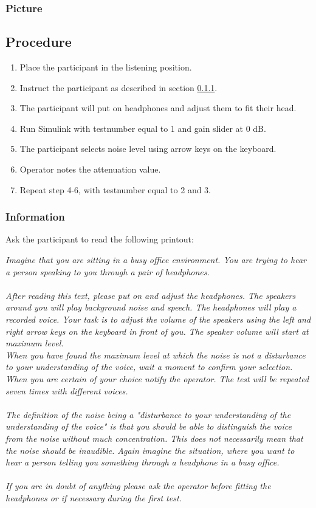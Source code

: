 \subsubsection{Picture}

\subsection{Procedure}

\begin{enumerate}
	\item Place the participant in the listening position.
	\item Instruct the participant as described in section \ref{subsubsec:attenuationInformation}.
	\item The participant will put on headphones and adjust them to fit their head.
	\item Run Simulink  with testnumber equal to 1 and gain slider at 0 dB.
	\item The participant selects noise level using arrow keys on the keyboard.
	\item Operator notes the attenuation value.
	\item Repeat step 4-6, with testnumber equal to 2 and 3.
\end{enumerate}

\subsubsection{Information}\label{subsubsec:attenuationInformation}
Ask the participant to read the following printout:

\textit{Imagine that you are sitting in a busy office environment. You are trying to hear a person speaking to you through a pair of headphones. \\\\
After reading this text, please put on and adjust the headphones. The speakers around you will play background noise and speech. The headphones will play a recorded voice. Your task is to adjust the volume of the speakers using the left and right arrow keys on the keyboard in front of you. The speaker volume will start at maximum level. \\
When you have found the maximum level at which the noise is not a disturbance to your understanding of the voice, wait a moment to confirm your selection. When you are certain of your choice notify the operator. 
The test will be repeated seven times with different voices. \\\\
The definition of the noise being a "disturbance to your understanding of the understanding of the voice" is that you should be able to distinguish the voice from the noise without much concentration. This does not necessarily mean that the noise should be inaudible. Again imagine the situation, where you want to hear a person telling you something through a headphone in a busy office.\\\\ 
If you are in doubt of anything please ask the operator before fitting the headphones or if necessary during the first test.}

